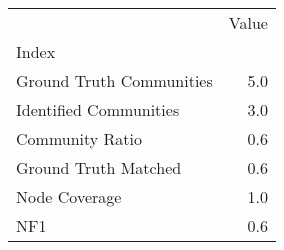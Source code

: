 \begin{tabular}{lr}
\toprule
{} &  Value \\
Index                    &        \\
\midrule
Ground Truth Communities &    5.0 \\
Identified Communities   &    3.0 \\
Community Ratio          &    0.6 \\
Ground Truth Matched     &    0.6 \\
Node Coverage            &    1.0 \\
NF1                      &    0.6 \\
\bottomrule
\end{tabular}

